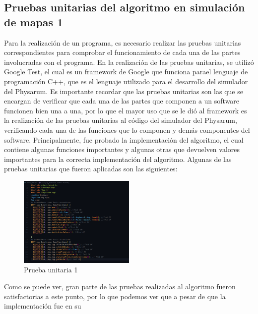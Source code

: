 \subsection{Pruebas unitarias del algoritmo en simulaci\'on de mapas 1} %
\label{sub:subsection name1}
    Para la realizaci\'on de un programa, es necesario realizar las
        pruebas unitarias correspondientes para comprobar el
        funcionamiento de cada una de las partes involucradas con el
        programa.
    \vskip 0.5cm
    En la realizaci\'on de las pruebas unitarias, se utiliz\'o Google
        Test, el cual es un framework de Google que funciona parael lenguaje de programaci\'on C++, que es el lenguaje
        utilizado para el desarrollo del simulador del Physarum. Es
        importante recordar que las pruebas unitarias son las que se
        encargan de verificar que cada una de las partes que
        componen a un software funcionen bien una a una, por lo
        que el mayor uso que se le di\'o al framework es la realizaci\'on
        de las pruebas unitarias al c\'odigo del simulador del
        Physarum, verificando cada una de las funciones que lo
        componen y dem\'as componentes del software.
    \vskip 0.5cm
    Principalmente, fue probado la implementaci\'on del
        algoritmo, el cual contiene algunas funciones importantes y
        algunas otras que devuelven valores importantes para la
        correcta implementaci\'on del algoritmo.
    \vskip 0.5cm
    Algunas de las pruebas unitarias que fueron aplicadas son las
    siguientes:
    \vskip 0.5cm
    \begin{figure}[htbp]
        \centering
        \includegraphics[width=0.5\textwidth]{./images/Pruebas/simulador/image007.png}
        \caption{Prueba unitaria 1}
        \label{fig:Prueba unitaria 1}
    \end{figure}
    \vskip 0.5cm
    Como se puede ver, gran parte de las pruebas realizadas al
        algoritmo fueron satisfactorias a este punto, por lo que
        podemos ver que a pesar de que la implementaci\'on fue en su

